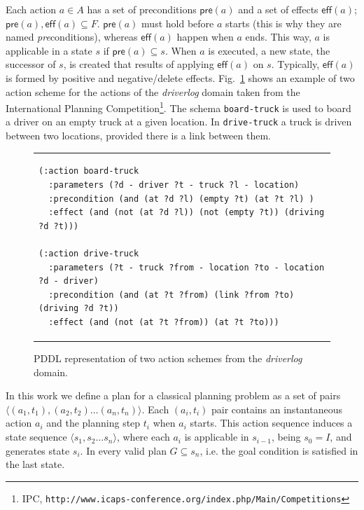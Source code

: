 \documentclass[runningheads]{llncs}
\newcommand{\tup}[1]{{\langle #1 \rangle}}
\newcommand{\pre}{\mathsf{pre}}    %
\newcommand{\eff}{\mathsf{eff}}    %
\begin{document}
Each action $a \in A$ has a set of preconditions $\pre(a)$ and a set of effects $\eff(a)$; $\pre(a), \eff(a) \subseteq F$. $\pre(a)$ must hold before $a$ starts (this is why they are named \emph{pre}conditions), whereas $\eff(a)$ happen when $a$ ends. This way, $a$ is applicable in a state $s$ if $\pre(a) \subseteq s$. When $a$ is executed, a new state, the successor of $s$, is created that results of applying $\eff(a)$ on $s$. Typically, $\eff(a)$ is formed by positive and negative/delete effects. Fig.~\ref{fig:exampleactions1} shows an example of two action scheme for the actions of the \emph{driverlog} domain taken from the International Planning Competition\footnote{IPC, \texttt{http://www.icaps-conference.org/index.php/Main/Competitions}}. The schema \texttt{board-truck} is used to board a driver on an empty truck at a given location. In \texttt{drive-truck} a truck is driven between two locations, provided there is a link between them.

\begin{figure}
\begin{tabular}{p{\textwidth}}
\begin{verbatim}
(:action board-truck
  :parameters (?d - driver ?t - truck ?l - location)
  :precondition (and (at ?d ?l) (empty ?t) (at ?t ?l) )
  :effect (and (not (at ?d ?l)) (not (empty ?t)) (driving ?d ?t)))

(:action drive-truck
  :parameters (?t - truck ?from - location ?to - location ?d - driver)
  :precondition (and (at ?t ?from) (link ?from ?to) (driving ?d ?t))
  :effect (and (not (at ?t ?from)) (at ?t ?to)))
\end{verbatim}
\end{tabular}
\caption{\small PDDL representation of two action schemes from the {\em driverlog} domain.}
\label{fig:exampleactions1}
\end{figure}


In this work we define a plan for a classical planning problem as a set of pairs $\tup{(a_1,t_1),(a_2,t_2)\ldots (a_n,t_n)}$. Each $(a_i,t_i)$ pair contains an instantaneous action $a_i$ and the planning step $t_i$ when $a_i$ starts. This action sequence induces a state sequence $\tup{s_1,s_2\ldots s_n}$, where each $a_i$ is applicable in $s_{i-1}$, being $s_0=I$, and generates state $s_i$. In every valid plan $G\subseteq s_n$, i.e. the goal condition is satisfied in the last state. %
\end{document}
